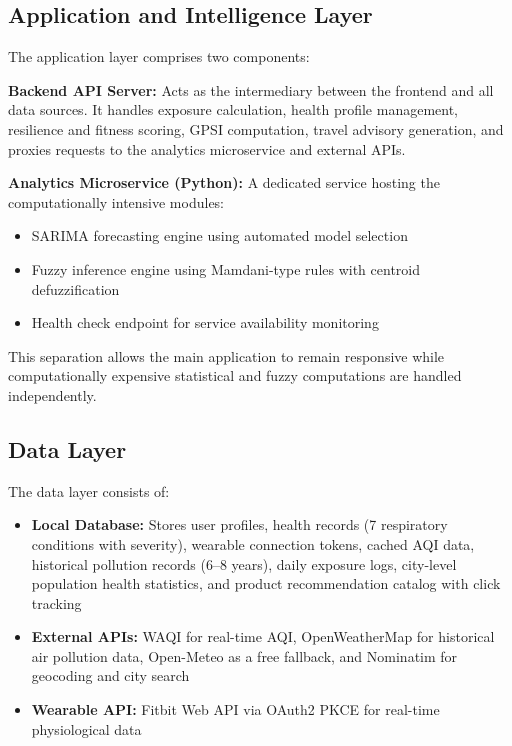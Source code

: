\documentclass[12pt,a4paper]{report}
\begin{document}
\subsection{Application and Intelligence Layer}

The application layer comprises two components:

\textbf{Backend API Server:} Acts as the intermediary between the frontend and all data sources. It handles exposure calculation, health profile management, resilience and fitness scoring, GPSI computation, travel advisory generation, and proxies requests to the analytics microservice and external APIs.

\textbf{Analytics Microservice (Python):} A dedicated service hosting the computationally intensive modules:
\begin{itemize}[leftmargin=*]
  \item SARIMA forecasting engine using automated model selection
  \item Fuzzy inference engine using Mamdani-type rules with centroid defuzzification
  \item Health check endpoint for service availability monitoring
\end{itemize}

This separation allows the main application to remain responsive while computationally expensive statistical and fuzzy computations are handled independently.

\subsection{Data Layer}

The data layer consists of:
\begin{itemize}[leftmargin=*]
  \item \textbf{Local Database:} Stores user profiles, health records (7 respiratory conditions with severity), wearable connection tokens, cached AQI data, historical pollution records (6--8 years), daily exposure logs, city-level population health statistics, and product recommendation catalog with click tracking
  \item \textbf{External APIs:} WAQI for real-time AQI, OpenWeatherMap for historical air pollution data, Open-Meteo as a free fallback, and Nominatim for geocoding and city search
  \item \textbf{Wearable API:} Fitbit Web API via OAuth2 PKCE for real-time physiological data
\end{itemize}
\end{document}
